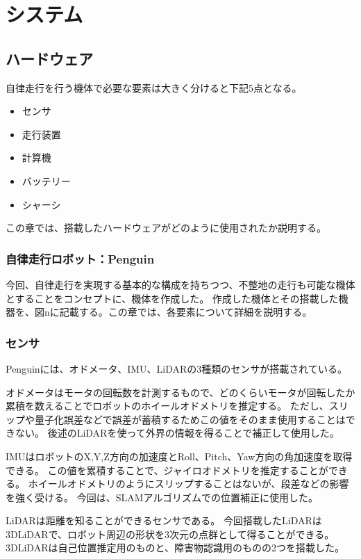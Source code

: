 \section{システム}


\subsection{ハードウェア}
自律走行を行う機体で必要な要素は大きく分けると下記5点となる。

\begin{itemize}
    \item センサ
    \item 走行装置
    \item 計算機
    \item バッテリー
    \item シャーシ
\end{itemize}

この章では、搭載したハードウェアがどのように使用されたか説明する。

\subsubsection{自律走行ロボット：Penguin}
今回、自律走行を実現する基本的な構成を持ちつつ、不整地の走行も可能な機体とすることをコンセプトに、機体を作成した。 
作成した機体とその搭載した機器を、図nに記載する。この章では、各要素について詳細を説明する。

\subsubsection{センサ}
Penguinには、オドメータ、IMU、LiDARの3種類のセンサが搭載されている。

オドメータはモータの回転数を計測するもので、どのくらいモータが回転したか累積を数えることでロボットのホイールオドメトリを推定する。
ただし、スリップや量子化誤差などで誤差が蓄積するためこの値をそのまま使用することはできない。
後述のLiDARを使って外界の情報を得ることで補正して使用した。

IMUはロボットのX,Y,Z方向の加速度とRoll、Pitch、Yaw方向の角加速度を取得できる。
この値を累積することで、ジャイロオドメトリを推定することができる。
ホイールオドメトリのようにスリップすることはないが、段差などの影響を強く受ける。
今回は、SLAMアルゴリズムでの位置補正に使用した。

LiDARは距離を知ることができるセンサである。
今回搭載したLiDARは3DLiDARで、ロボット周辺の形状を3次元の点群として得ることができる。
3DLiDARは自己位置推定用のものと、障害物認識用のものの2つを搭載した。

